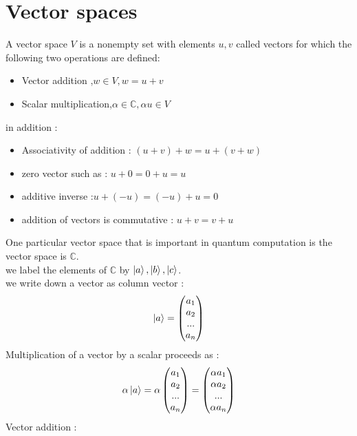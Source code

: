\documentclass[12pt,oneside]{book}
\begin{document}
\section{Vector spaces}
A vector space $V$ is a nonempty set with elements $u, v$ called vectors for which the following two operations are defined:
\begin{itemize}
    \item Vector addition ,$w \in V, w =u +v$
    \item Scalar multiplication,$\alpha \in \mathbb{C}, \alpha u \in V $
\end{itemize}
in addition :
\begin{itemize}
    \item Associativity of addition : $(u+v) + w = u + (v+w)$
    \item zero vector such as : $u +0 = 0 + u  =u$
    \item additive inverse :$u +(-u) = (-u)+u=0$
    \item addition of vectors is commutative : $u + v = v +u$
\end{itemize}
One particular vector space that is important in quantum computation is the vector space is $\mathbb{C}$.\\
we label the elements of $\mathbb{C}$ by $\ket{a},\ket{b},\ket{c}$.\\
we write down a vector as column vector :
\[\ket{a} =  \left( \begin{matrix}
            a_1 \\
            a_2 \\
            ... \\
            a_n
        \end{matrix}\right)\]
Multiplication of a vector by a scalar proceeds as :
\[ \alpha \ket{a} = \alpha\left( \begin{matrix}
            a_1 \\
            a_2 \\
            ... \\
            a_n
        \end{matrix}\right) = \left( \begin{matrix}
            \alpha a_1 \\
            \alpha a_2 \\
            ...        \\
            \alpha a_n
        \end{matrix}\right) \]
Vector addition :
\end{document}
